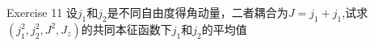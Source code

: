 
Exercise 11
设$j_1$和$j_2$是不同自由度得角动量，二者耦合为$J=j_1+j_1$,试求$(j_1^2,j_2^2,J^2,J_z)$的共同本征函数下$j_1$和$j_2$的平均值